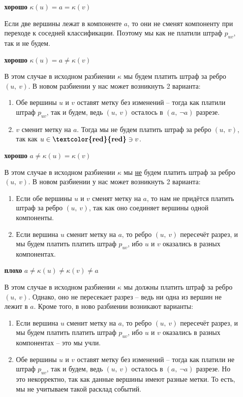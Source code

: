 \documentclass[a4paper,12pt]{article}
\begin{document}
\begin{itemize}
    \item[\textbf{хорошо}] $\kappa(u) = a = \kappa(v)$
    
    Если две вершины лежат в компоненте $a$, то они не сменят компоненту при переходе к соседней классификации. Поэтому мы как не платили штраф $p_{uv}$, так и не будем.
    
    \item[\textbf{хорошо}] $\kappa(u) = a \neq \kappa(v)$
    
    В этом случае в исходном разбиении $\kappa$ мы будем платить штраф за ребро $(u,\ v)$. В новом разбиении у нас может возникнуть 2 варианта:
    \begin{enumerate}
        \item Обе вершины $u$ и $v$ оставят метку без изменений -- тогда как платили штраф $p_{uv}$, так и будем, ведь $(u,\ v)$ осталось в $(a,\ \neg a)$ разрезе.
        \item $v$ сменит метку на $a$. Тогда мы не будем платить штраф за ребро $(u,\ v)$, так как $u \in \textbf{\textcolor{red}{red}} \ni v$.
    \end{enumerate}
    
    \item[\textbf{хорошо}] $a \neq \kappa(u) = \kappa(v)$
    
    В этом случае в исходном разбиении $\kappa$ мы \underline{не} будем платить штраф за ребро $(u,\ v)$. В новом разбиении у нас может возникнуть 2 варианта:
    \begin{enumerate}
        \item Если обе вершины $u$ и $v$ сменят метку на $a$, то нам не придётся платить штраф за ребро $(u,\ v)$, так как оно соединяет вершины одной компоненты.
        \item Если вершина $u$ сменит метку на $a$, то ребро $(u,\ v)$ пересечёт разрез, и мы будем платить платить штраф $p_{uv}$, ибо $u$ и $v$ оказались в разных компонентах.
    \end{enumerate}
    
    \item[\textbf{плохо}] $a \neq \kappa(u) \neq \kappa(v) \neq a$
    
    В этом случае в исходном разбиении $\kappa$ мы должны платить штраф за ребро $(u,\ v)$. Однако, оно не пересекает разрез -- ведь ни одна из вершин не лежит в $a$. Кроме того, в ново разбиении возникают варианты:
    \begin{enumerate}
        \item Если вершина $u$ сменит метку на $a$, то ребро $(u,\ v)$ пересечёт разрез, и мы будем платить платить штраф $p_{uv}$, ибо $u$ и $v$ оказались в разных компонентах -- это мы учли.
        \item Обе вершины $u$ и $v$ оставят метку без изменений -- тогда как платили не штраф $p_{uv}$, так и будем, ведь $(u,\ v)$ осталось в $(a,\ \neg a)$ разрезе. Но это некорректно, так как данные вершины имеют разные метки. То есть, мы не учитываем такой расклад событий.
    \end{enumerate}
\end{itemize}
\end{document}
